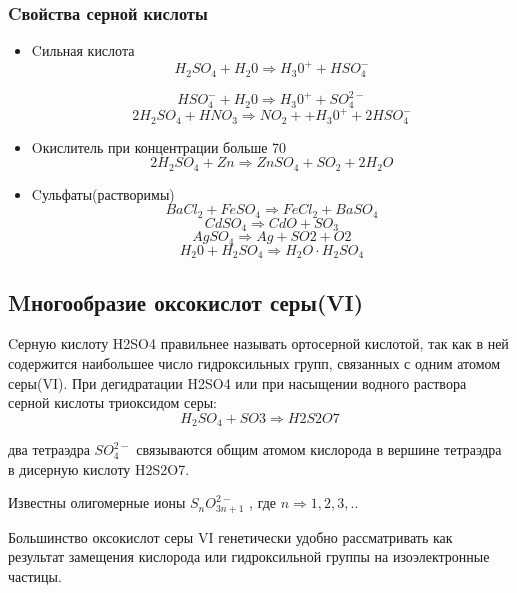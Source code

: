 \documentclass[11pt]{article}
\begin{document}
\subsubsection{Cвойства серной кислоты}
\begin{itemize}
\item Cильная кислота
$$H_2SO_4 + H_2 0 \Rightarrow H_3 0 ^+
+ HSO_4^{-}$$

$$HSO_4^- +H_2 0 \Rightarrow H_3 0 ^+ + SO_4^{2-}$$
$$2H_2SO_4 + HNO_3 \Rightarrow NO_2 + +H_3 0^+ +2HSO_4^-$$
\item Oкислитель при концентрации больше 70
$$2H_2SO_4 + Zn \Rightarrow ZnSO_4 + SO_2 + 2H_2O$$
\item Cульфаты(растворимы)
$$BaCl_2 + FeSO_4 \Rightarrow FeCl_2 + BaSO_4$$
$$CdSO_4 \Rightarrow CdO + SO_3$$
$$AgSO_4 \Rightarrow Ag + SO2 + O2$$
$$H_2 0 + H_2SO_4 \Rightarrow H_2O \cdot H_2SO_4$$
\end{itemize}

\subsection{Mногообразие оксокислот серы(VI)}

Cерную кислоту H2SO4 правильнее называть ортосерной кислотой, так как в ней содержится наибольшее
число гидроксильных групп, связанных с одним атомом серы(VI). При дегидратации H2SO4 или при
насыщении водного раствора серной кислоты триоксидом серы: 
$$H_2SO_4 + SO3 \Rightarrow H2S2O7 $$

два тетраэдра $SO_4^{2-}$ связываются общим атомом кислорода в вершине тетраэдра в дисерную кислоту H2S2O7.

Известны олигомерные ионы
$S_nO_{3n+1}^{2-}$
, где $n \Rightarrow 1,2,3,..$

Большинство оксокислот серы VI генетически удобно рассматривать как результат замещения кислорода или гидроксильной группы на изоэлектронные частицы.
\end{document}
